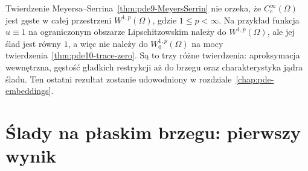 \begin{uwaga}
\label{rem:pde-v42-density}
Twierdzenie Meyersa--Serrina~\ref{thm:pde9-MeyersSerrin}
nie orzeka, że $C_c^\infty(\Omega)$ jest gęste w całej
przestrzeni $W^{1,p}(\Omega)$, gdzie $1\le p<\infty$.
Na przykład funkcja
$u\equiv1$ na ograniczonym obszarze Lipschitzowskim
należy do $W^{1,p}(\Omega)$, ale jej ślad jest równy $1$,
a więc nie należy do $W_0^{1,p}(\Omega)$ na mocy
twierdzenia~\ref{thm:pde10-trace-zero}.
Są to trzy różne twierdzenia: aproksymacja wewnętrzna,
gęstość gładkich restrykcji aż do brzegu oraz
charakterystyka jądra śladu. Ten ostatni rezultat
zostanie udowodniony w rozdziale~\ref{chap:pde-embeddings}.
\end{uwaga}

\section{Ślady na płaskim brzegu: pierwszy wynik}
\label{sec:pde9-traces}

